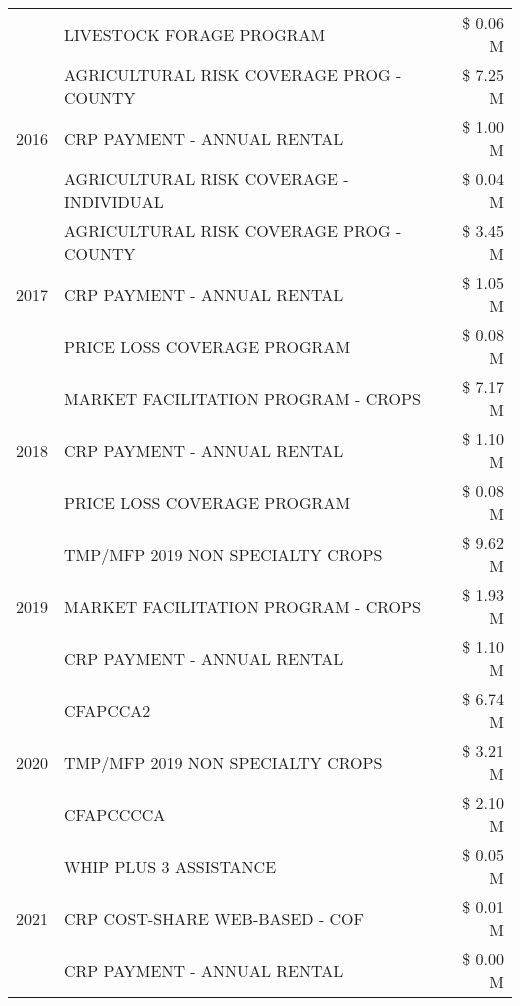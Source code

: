 \begin{tabular}{llr}
 & LIVESTOCK FORAGE PROGRAM & \$ 0.06 M \\
\cline{1-3}
\multirow[t]{3}{*}{2016} & AGRICULTURAL RISK COVERAGE PROG - COUNTY      & \$ 7.25 M \\
 & CRP PAYMENT - ANNUAL RENTAL                   & \$ 1.00 M \\
 & AGRICULTURAL RISK COVERAGE - INDIVIDUAL       & \$ 0.04 M \\
\cline{1-3}
\multirow[t]{3}{*}{2017} & AGRICULTURAL RISK COVERAGE PROG - COUNTY & \$ 3.45 M \\
 & CRP PAYMENT - ANNUAL RENTAL & \$ 1.05 M \\
 & PRICE LOSS COVERAGE PROGRAM & \$ 0.08 M \\
\cline{1-3}
\multirow[t]{3}{*}{2018} & MARKET FACILITATION PROGRAM - CROPS & \$ 7.17 M \\
 & CRP PAYMENT - ANNUAL RENTAL & \$ 1.10 M \\
 & PRICE LOSS COVERAGE PROGRAM & \$ 0.08 M \\
\cline{1-3}
\multirow[t]{3}{*}{2019} & TMP/MFP 2019 NON SPECIALTY CROPS & \$ 9.62 M \\
 & MARKET FACILITATION PROGRAM - CROPS & \$ 1.93 M \\
 & CRP PAYMENT - ANNUAL RENTAL & \$ 1.10 M \\
\cline{1-3}
\multirow[t]{3}{*}{2020} & CFAPCCA2 & \$ 6.74 M \\
 & TMP/MFP 2019 NON SPECIALTY CROPS & \$ 3.21 M \\
 & CFAPCCCCA & \$ 2.10 M \\
\cline{1-3}
\multirow[t]{3}{*}{2021} & WHIP PLUS 3 ASSISTANCE & \$ 0.05 M \\
 & CRP COST-SHARE WEB-BASED - COF & \$ 0.01 M \\
 & CRP PAYMENT - ANNUAL RENTAL & \$ 0.00 M \\
\cline{1-3}
\bottomrule
\end{tabular}
